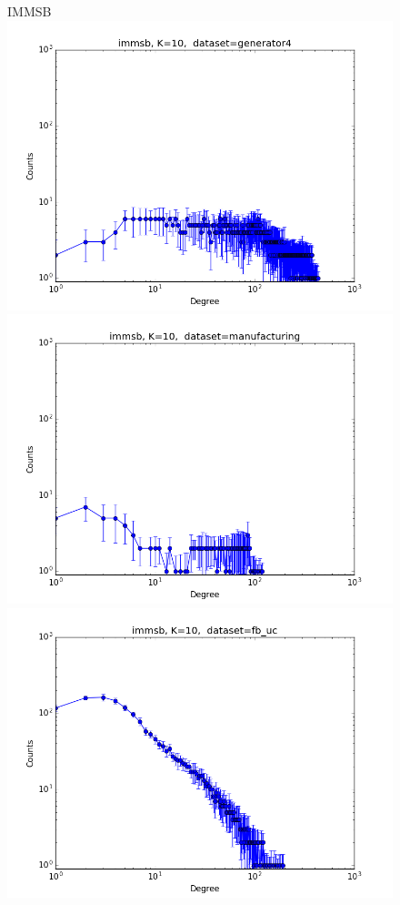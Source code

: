 \documentclass[a4paper, 12pt]{article}
\begin{document}
\begin{figure}[ht]
    \vspace{-3cm}
	\centering IMMSB\\
	\includegraphics[scale=0.27]{img/expe/4_mmsb/figure_1}
	\endminipage
	\includegraphics[scale=0.27]{img/expe/5_mmsb/figure_1}
	\endminipage
	\includegraphics[scale=0.27]{img/expe/6_mmsb/figure_1}

\end{figure}
\end{document}
